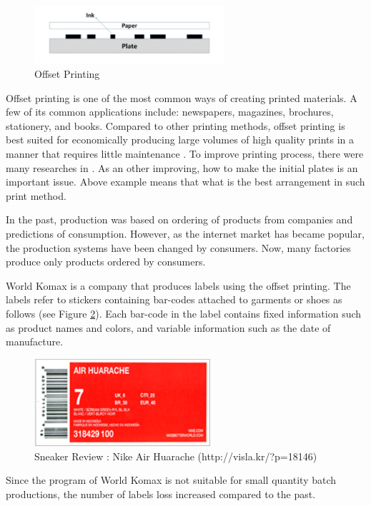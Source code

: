 \documentclass[review]{elsarticle}
\begin{document}
\begin{figure}[h!]
	\centering
	\includegraphics[width=7cm]{OffsetPrint.pdf}
	\caption{Offset Printing}
	\label{fig:OffsetPrint}
\end{figure}

Offset printing is one of the most common ways of creating printed materials. A few of its common applications include: newspapers, magazines, brochures, stationery, and books. Compared to other printing methods, offset printing is best suited for economically producing large volumes of high quality prints in a manner that requires little maintenance \cite{Kipphan2001}. 
To improve printing process, there were many researches in \cite{AlChan, Muscle, Carmo}.
As an other improving, how to make the initial plates is an important issue. Above example means that what is the best arrangement in such print method.

In the past, production was based on ordering of products from companies and predictions of consumption. 
However, as the internet market has became popular, the production systems have been changed by consumers. 
Now, many factories produce only products ordered by consumers.

World Komax is a company that produces labels using the offset printing. The labels refer to stickers containing bar-codes attached to garments or shoes as follows (see Figure \ref{fig:AirHuarache}). Each bar-code in the label contains fixed information such as product names and colors, and variable information such as the date of manufacture.

\begin{figure}[h!]
	\centering
	\includegraphics[width=6.5cm]{AirHuarache.pdf}
	\caption{Sneaker Review : Nike Air Huarache (http://visla.kr/?p=18146)}
	\label{fig:AirHuarache}       %
\end{figure}

\noindent
Since the program of World Komax is not suitable for small quantity batch productions, the number of labels loss increased compared to the past.
\end{document}
